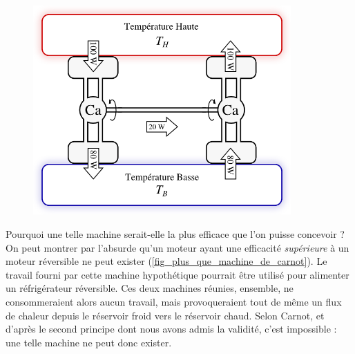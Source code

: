 		\begin{figure}
			\begin{center}
				\includegraphics[height=8cm]{images/carnot_moteur_refrigerateur.png}
			\end{center}
			\label{fig_deux_machines_de_carnot}
		\end{figure}

		Pourquoi une telle machine serait-elle la plus efficace que l’on puisse concevoir ? On peut montrer par l’absurde qu’un moteur ayant une efficacité \emph{supérieure} à un moteur réversible ne peut exister (\cref{fig_plus_que_machine_de_carnot}). Le travail fourni par cette machine hypothétique pourrait être utilisé pour alimenter un réfrigérateur réversible. Ces deux machines réunies, ensemble, ne consommeraient alors aucun travail, mais provoqueraient tout de même un flux de chaleur depuis le réservoir froid vers le réservoir chaud. Selon Carnot, et d’après le second principe dont nous avons admis la validité, c’est impossible : une telle machine ne peut donc exister.

